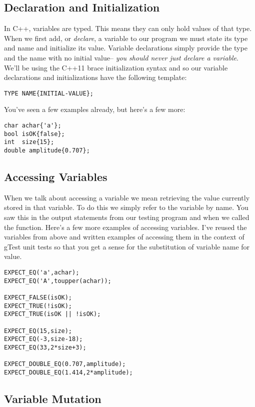 \documentclass[]{tufte-handout}
\begin{document}
\subsection{Declaration and Initialization}

In C++, variables are typed. This means they can only hold values of that type. When we first add, or \textit{declare}, a variable to our program we must state its type and name and initialize its value. Variable declarations simply provide the type and the name with no initial value-- \textit{you should never just declare a variable}. We'll be using the C++11 brace initialization syntax and so our variable declarations and initializations have the following template:
\begin{verbatim}
TYPE NAME{INITIAL-VALUE};
\end{verbatim}

You've seen a few examples already, but here's a few more:
\begin{verbatim}
char achar{'a'};
bool isOK{false};
int  size{15};
double amplitude{0.707};
\end{verbatim}

\subsection{Accessing Variables}

When we talk about accessing a variable we mean retrieving the value currently stored in that variable. To do this we simply refer to the variable by name. You saw this in the output statements from our testing program and when we called the function.  Here's a few more examples of accessing variables.  I've reused the variables from above and written examples of accessing them in the context of gTest unit tests so that you get a sense for the substitution of variable name for value.

\begin{verbatim}
EXPECT_EQ('a',achar);
EXPECT_EQ('A',toupper(achar));

EXPECT_FALSE(isOK);
EXPECT_TRUE(!isOK);
EXPECT_TRUE(isOK || !isOK);

EXPECT_EQ(15,size);
EXPECT_EQ(-3,size-18);
EXPECT_EQ(33,2*size+3);

EXPECT_DOUBLE_EQ(0.707,amplitude);
EXPECT_DOUBLE_EQ(1.414,2*amplitude);
\end{verbatim}


\subsection{Variable Mutation}
\end{document}
